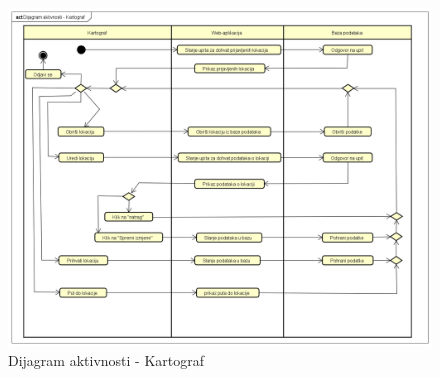 \begin{itemize}
\begin{figure}[H]
			\label{fig:promjene}
		\end{figure}
		\begin{figure}[H]
		\includegraphics[width=\textwidth]{slike/Dijagram_aktivnosti_-_Kartograf.png}
		\centering
		\caption{Dijagram aktivnosti - Kartograf}
		\label{fig:promjene}
		\end{figure}

		\eject

\end{itemize}
